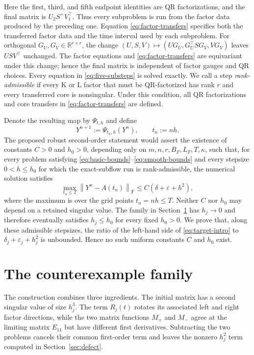 \documentclass[]{article}
\numberwithin{equation}{section}
\theoremstyle{plain}
\theoremstyle{remark}
\newcommand{\F}{\mathrm F}
\newcommand{\norm}[1]{\left\lVert #1\right\rVert}
\newcommand{\eps}{\varepsilon}
\begin{document}
Here the first, third, and fifth endpoint identities are QR
factorizations, and the final matrix is
$U_2S^+V_1^\top$.  Thus every subproblem is run from the factor data
produced by the preceding one.  Equation \eqref{eq:factor-transfers}
specifies both the transferred factor data and the time interval used by
each subproblem.
For orthogonal $G_U,G_V\in\mathbb R^{r\times r}$, the change
$(U,S,V)\mapsto(UG_U,G_U^\top SG_V,VG_V)$ leaves $USV^\top$ unchanged.
The factor equations and \eqref{eq:factor-transfers} are equivariant
under this change; hence the final matrix is independent of factor
gauges and QR choices.
Every equation in \eqref{eq:five-substeps} is solved exactly.  We call a
step \emph{rank-admissible} if every K or L factor that must be
QR-factorized has rank $r$ and every transferred core is nonsingular.
Under this condition, all QR factorizations and core transfers in
\eqref{eq:factor-transfers} are defined.

Denote the resulting map by $\Psi_{t,h}$ and define
\begin{equation}\label{eq:numerical-method}
 Y^{n+1}:=\Psi_{t_n,h}(Y^n),\qquad t_n:=nh.
\end{equation}
The proposed robust second-order statement would assert the existence
of constants $C>0$ and $h_0>0$, depending only on
$m,n,r,B_F,L_F,T,\kappa$, such that, for every problem satisfying
\eqref{eq:basic-bounds}--\eqref{eq:smooth-bounds} and every stepsize
$0<h\le h_0$ for which the exact-subflow run is rank-admissible, the
numerical solution satisfies
\begin{equation}\label{eq:target-intro}
 \max_{t_n\le T}\norm{Y^n-A(t_n)}_{\F}
 \le C(\delta+\eps+h^2),
\end{equation}
where the maximum is over the grid points $t_n=nh\le T$.  Neither $C$
nor $h_0$ may depend on a retained singular value.  The family in
Section~\ref{sec:construction}
has $h_j\to0$ and therefore eventually satisfies $h_j\le h_0$ for
every fixed $h_0>0$.
We prove that, along these admissible stepsizes, the ratio of the
left-hand side of \eqref{eq:target-intro} to
$\delta_j+\eps_j+h_j^2$ is unbounded.  Hence no such uniform constants
$C$ and $h_0$ exist.

\section{The counterexample family}
\label{sec:construction}

The construction combines three ingredients.  The initial matrix has a
second singular value of size $h_j^3$.  The term $R_j(t)$ rotates its
associated left and right factor directions, while the two matrix
functions $M_+$ and $M_-$ agree at the limiting matrix $E_{11}$ but have
different first derivatives.  Subtracting the two problems cancels their
common first-order term and leaves the nonzero $h_j^2$ term computed in
Section~\ref{sec:defect}.
\end{document}
